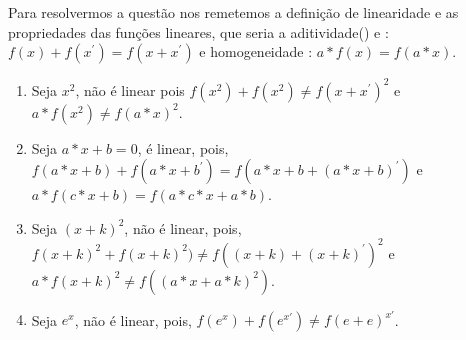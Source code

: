 \begin{resol}
        \begin{flushleft}
        Para resolvermos a questão nos remetemos a definição de linearidade e as propriedades das funções lineares,
        que seria a aditividade() e : $f(x) + f(x^{'}) = f(x + x^{'})$
        e homogeneidade : $a*f(x) = f(a*x)$.
        \end{flushleft}
        \begin{flushleft}
            \begin{enumerate}
                \item Seja $x^{2}$, não é linear pois $f(x^{2}) + f(x^{2}) \neq f(x + x^{'})^2$ e $a*f(x^{2}) \neq f(a*x)^{2}$.
                \item Seja $a*x + b = 0$, é linear, pois, $f(a*x + b) + f(a*x + b^{'}) = f(a*x + b + (a*x + b)^{'})$ e  $a*f(c*x + b) = f(a*c*x + a*b)$.
                \item Seja $(x + k)^{2}$, não é linear, pois, $f(x + k)^{2} + f(x + k)^{2}) \neq f((x + k) + (x + k)^{'})^2$
            e $a*f(x + k)^{2} \neq f((a*x + a*k)^{2})$.
                \item Seja $e^{x}$, não é linear, pois, $f(e^{x}) + f(e^{x'}) \neq f(e + e)^{x'}$.
            \end{enumerate}
        \end{flushleft}
\end{resol}
